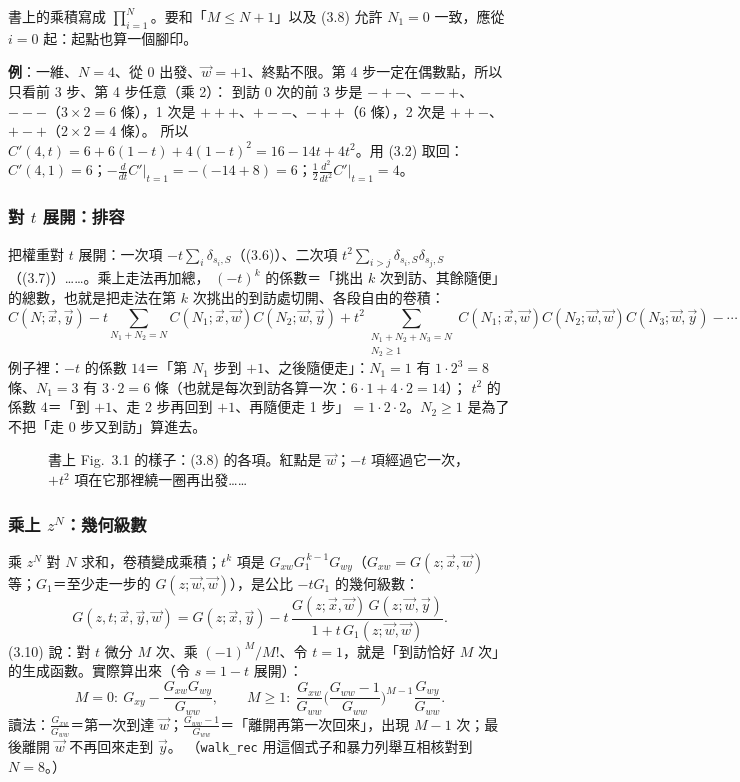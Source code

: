 \begin{notebox}[〔注〕p.~52--53，(3.3)(3.5)]
書上的乘積寫成 $\prod_{i=1}^{N}$。要和「$M\le N+1$」以及 (3.8) 允許 $N_1=0$ 一致，應從 $i=0$ 起：起點也算一個腳印。
\end{notebox}

\textbf{例}：一維、$N=4$、從 $0$ 出發、$\vec w=+1$、終點不限。第 4 步一定在偶數點，所以只看前 3 步、第 4 步任意（乘 2）：
到訪 0 次的前 3 步是 $-+-$、$--+$、$---$（$3\times2=6$ 條），1 次是 $+++$、$+--$、$-++$（6 條），2 次是 $++-$、$+-+$（$2\times2=4$ 條）。
所以 $C'(4,t)=6+6(1-t)+4(1-t)^2=16-14t+4t^2$。用 (3.2) 取回：$C'(4,1)=6$；$-\frac{d}{dt}C'\big|_{t=1}=-(-14+8)=6$；$\frac12\frac{d^2}{dt^2}C'\big|_{t=1}=4$。

\subsubsection{對 \texorpdfstring{$t$}{t} 展開：排容}
把權重對 $t$ 展開：一次項 $-t\sum_i\delta_{s_i,S}$（(3.6)）、二次項 $t^2\sum_{i>j}\delta_{s_i,S}\delta_{s_j,S}$（(3.7)）……。乘上走法再加總，
$(-t)^k$ 的係數＝「挑出 $k$ 次到訪、其餘隨便」的總數，也就是把走法在第 $k$ 次挑出的到訪處切開、各段自由的卷積：
\[C(N;\vec x,\vec y)-t\!\!\sum_{N_1+N_2=N}\!\!C(N_1;\vec x,\vec w)C(N_2;\vec w,\vec y)
+t^2\!\!\!\!\sum_{\substack{N_1+N_2+N_3=N\\N_2\ge1}}\!\!\!\!C(N_1;\vec x,\vec w)C(N_2;\vec w,\vec w)C(N_3;\vec w,\vec y)-\cdots\tag{3.8}\]
例子裡：$-t$ 的係數 $14$＝「第 $N_1$ 步到 $+1$、之後隨便走」：$N_1=1$ 有 $1\cdot2^3=8$ 條、$N_1=3$ 有 $3\cdot2=6$ 條（也就是每次到訪各算一次：$6\cdot1+4\cdot2=14$）；
$t^2$ 的係數 $4$＝「到 $+1$、走 2 步再回到 $+1$、再隨便走 1 步」$=1\cdot2\cdot2$。$N_2\ge1$ 是為了不把「走 0 步又到訪」算進去。
\begin{figure}[H]
\centering
\ThreeFigVirial
\caption{書上 Fig.~3.1 的樣子：(3.8) 的各項。紅點是 $\vec w$；$-t$ 項經過它一次，$+t^2$ 項在它那裡繞一圈再出發……}\label{three-fig-virial}
\end{figure}

\subsubsection{乘上 \texorpdfstring{$z^N$}{z 的 N 次方}：幾何級數}
乘 $z^N$ 對 $N$ 求和，卷積變成乘積；$t^k$ 項是 $G_{xw}G_1^{\,k-1}G_{wy}$（$G_{xw}=G(z;\vec x,\vec w)$ 等；$G_1$＝至少走一步的 $G(z;\vec w,\vec w)$），是公比 $-tG_1$ 的幾何級數：
\[G(z,t;\vec x,\vec y,\vec w)=G(z;\vec x,\vec y)-t\,\frac{G(z;\vec x,\vec w)\,G(z;\vec w,\vec y)}{1+t\,G_1(z;\vec w,\vec w)}.\tag{3.9}\]
(3.10) 說：對 $t$ 微分 $M$ 次、乘 $(-1)^M/M!$、令 $t=1$，就是「到訪恰好 $M$ 次」的生成函數。實際算出來（令 $s=1-t$ 展開）：
\[M=0:\ G_{xy}-\frac{G_{xw}G_{wy}}{G_{ww}},\qquad M\ge1:\ \frac{G_{xw}}{G_{ww}}\Big(\frac{G_{ww}-1}{G_{ww}}\Big)^{M-1}\frac{G_{wy}}{G_{ww}}.\]
讀法：$\frac{G_{xw}}{G_{ww}}$＝第一次到達 $\vec w$；$\frac{G_{ww}-1}{G_{ww}}$＝「離開再第一次回來」，出現 $M-1$ 次；最後離開 $\vec w$ 不再回來走到 $\vec y$。
（\texttt{walk\_rec} 用這個式子和暴力列舉互相核對到 $N=8$。）

